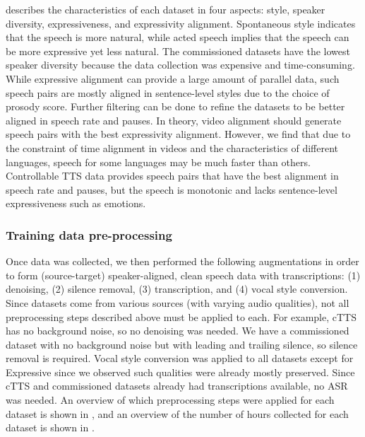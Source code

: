  describes the characteristics of each dataset in four aspects: style, speaker diversity, expressiveness, and expressivity alignment.
Spontaneous style indicates that the speech is more natural, while acted speech implies that the speech can be more expressive yet less natural.
The commissioned datasets have the lowest speaker diversity because the data collection was expensive and time-consuming.
While expressive alignment can provide a large amount of parallel data, such speech pairs are mostly aligned in sentence-level styles due to the choice of prosody score. Further filtering can be done to refine the datasets to be better aligned in speech rate and pauses.
In theory, video alignment should generate speech pairs with the best expressivity alignment. However, we find that due to the constraint of time alignment in videos and the characteristics of different languages, speech for some languages may be much faster than others.
Controllable TTS data provides speech pairs that have the best alignment in speech rate and pauses, but the speech is monotonic and lacks sentence-level expressiveness such as emotions.


\subsubsection{Training data pre-processing}
\label{subsection:expressive-data-processing}

Once data was collected, we then performed the following augmentations in order to form (source-target) speaker-aligned, clean speech data with transcriptions: (1) denoising, (2) silence removal, (3) transcription, and (4) vocal style conversion. Since datasets come from various sources (with varying audio qualities), not all preprocessing steps described above must be applied to each. For example, cTTS has no background noise, so no denoising was needed. We have a commissioned dataset with no background noise but with leading and trailing silence, so silence removal is required. Vocal style conversion was applied to all datasets except for \sonar Expressive since we observed such qualities were already mostly preserved. Since cTTS and commissioned datasets already had transcriptions available, no ASR was needed.
An overview of which preprocessing steps were applied for each dataset is shown in , and an overview of the number of hours collected for each dataset is shown in .


